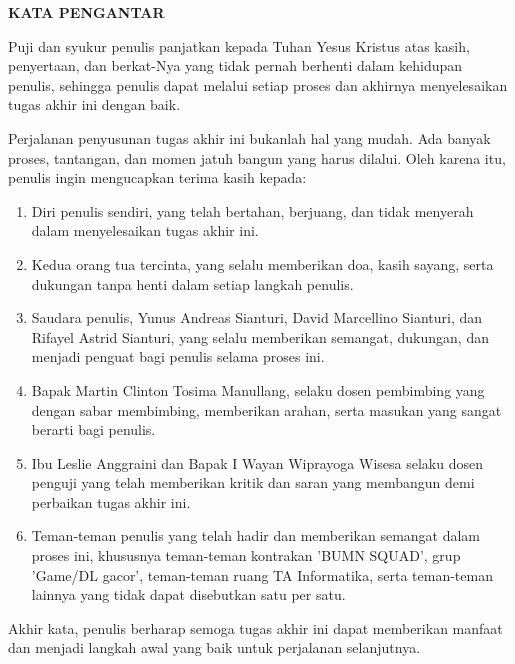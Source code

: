 \clearpage
{}%

\begin{justifying}
	\large \bfseries \centering \MakeUppercase{Kata Pengantar}\linebreak
	
	\normalsize \normalfont \justifying
	Puji dan syukur penulis panjatkan kepada Tuhan Yesus Kristus atas kasih, penyertaan, dan berkat-Nya yang tidak pernah berhenti dalam kehidupan penulis, sehingga penulis dapat melalui setiap proses dan akhirnya menyelesaikan tugas akhir ini dengan baik.\par
	
	Perjalanan penyusunan tugas akhir ini bukanlah hal yang mudah. Ada banyak proses, tantangan, dan momen jatuh bangun yang harus dilalui. Oleh karena itu, penulis ingin mengucapkan terima kasih kepada:\par
	\begin{enumerate}
		\item Diri penulis sendiri, yang telah bertahan, berjuang, dan tidak menyerah dalam menyelesaikan tugas akhir ini.
		\item Kedua orang tua tercinta, yang selalu memberikan doa, kasih sayang, serta dukungan tanpa henti dalam setiap langkah penulis.
		\item Saudara penulis, Yunus Andreas Sianturi, David Marcellino Sianturi, dan Rifayel Astrid Sianturi, yang selalu memberikan semangat, dukungan, dan menjadi penguat bagi penulis selama proses ini.
		\item Bapak Martin Clinton Tosima Manullang, selaku dosen pembimbing yang dengan sabar membimbing, memberikan arahan, serta masukan yang sangat berarti bagi penulis.
		\item Ibu Leslie Anggraini dan Bapak I Wayan Wiprayoga Wisesa selaku dosen penguji yang telah memberikan kritik dan saran yang membangun demi perbaikan tugas akhir ini.
		\item Teman-teman penulis yang telah hadir dan memberikan semangat dalam proses ini, khususnya teman-teman kontrakan 'BUMN SQUAD', grup 'Game/DL gacor', teman-teman ruang TA Informatika, serta teman-teman lainnya yang tidak dapat disebutkan satu per satu.
	\end{enumerate} \par
	Akhir kata, penulis berharap semoga tugas akhir ini dapat memberikan manfaat dan menjadi langkah awal yang baik untuk perjalanan selanjutnya.
	\vfill
	
\end{justifying}
\clearpage






